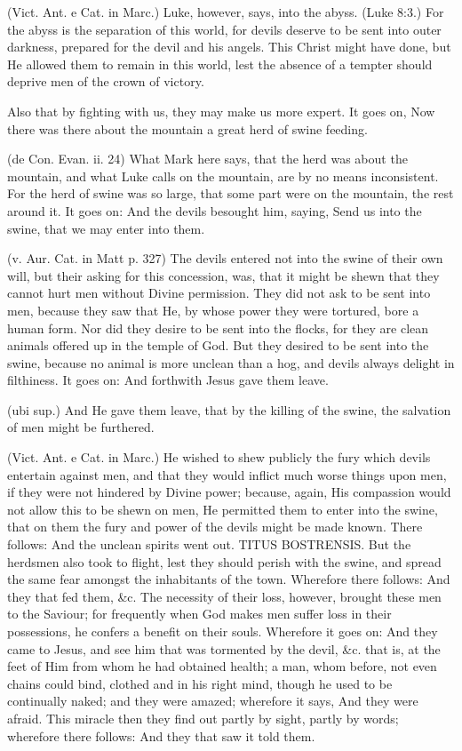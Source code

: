  (Vict. Ant. e Cat. in Marc.) Luke, however, says, into the abyss. (Luke 8:3.) For the abyss is the separation of this world, for devils deserve to be sent into outer darkness, prepared for the devil and his angels. This Christ might have done, but He allowed them to remain in this world, lest the absence of a tempter should deprive men of the crown of victory.

 Also that by fighting with us, they may make us more expert. It goes on, Now there was there about the mountain a great herd of swine feeding.

 (de Con. Evan. ii. 24) What Mark here says, that the herd was about the mountain, and what Luke calls on the mountain, are by no means inconsistent. For the herd of swine was so large, that some part were on the mountain, the rest around it. It goes on: And the devils besought him, saying, Send us into the swine, that we may enter into them.

 (v. Aur. Cat. in Matt p. 327) The devils entered not into the swine of their own will, but their asking for this concession, was, that it might be shewn that they cannot hurt men without Divine permission. They did not ask to be sent into men, because they saw that He, by whose power they were tortured, bore a human form. Nor did they desire to be sent into the flocks, for they are clean animals offered up in the temple of God. But they desired to be sent into the swine, because no animal is more unclean than a hog, and devils always delight in filthiness. It goes on: And forthwith Jesus gave them leave.

 (ubi sup.) And He gave them leave, that by the killing of the swine, the salvation of men might be furthered.

 (Vict. Ant. e Cat. in Marc.) He wished to shew publicly the fury which devils entertain against men, and that they would inflict much worse things upon men, if they were not hindered by Divine power; because, again, His compassion would not allow this to be shewn on men, He permitted them to enter into the swine, that on them the fury and power of the devils might be made known. There follows: And the unclean spirits went out. TITUS BOSTRENSIS. But the herdsmen also took to flight, lest they should perish with the swine, and spread the same fear amongst the inhabitants of the town. Wherefore there follows: And they that fed them, \&c. The necessity of their loss, however, brought these men to the Saviour; for frequently when God makes men suffer loss in their possessions, he confers a benefit on their souls. Wherefore it goes on: And they came to Jesus, and see him that was tormented by the devil, \&c. that is, at the feet of Him from whom he had obtained health; a man, whom before, not even chains could bind, clothed and in his right mind, though he used to be continually naked; and they were amazed; wherefore it says, And they were afraid. This miracle then they find out partly by sight, partly by words; wherefore there follows: And they that saw it told them.

